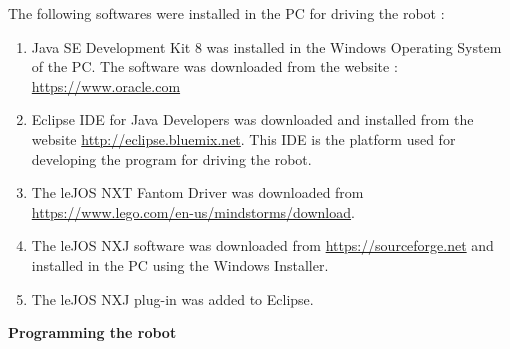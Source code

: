 \documentclass[10pt,a4paper]{article}
\begin{document}
		The following softwares were installed in the PC for driving the robot :
			\vspace{0.3cm}
			\begin{enumerate}
				
				\item
				Java SE Development Kit 8 was installed in the Windows Operating System of the PC. The software was downloaded from the website :\\ \href{https://www.oracle.com/technetwork/java/javase/downloads/jdk8-downloads-2133151.html}{https://www.oracle.com}
				\vspace{0.2cm}
				
				\item
				Eclipse IDE for Java Developers was downloaded and installed from the website 
				\href{http://eclipse.bluemix.net/packages/neon/?JAVA-WIN32}{http://eclipse.bluemix.net}. This IDE is the platform used for developing the program for driving the robot.
				\vspace{0.2cm}
				
				\item
				The leJOS NXT Fantom Driver was downloaded from  \href{https://www.lego.com/en-us/mindstorms/downloads}{https://www.lego.com/en-us/mindstorms/download}. 
				\vspace{0.2cm}
				
				\item
				The leJOS NXJ software was downloaded from \href{https://sourceforge.net/projects/nxt.lejos.p/files/}{https://sourceforge.net} and installed in the PC using the Windows Installer.
				\vspace{0.2cm}
				
				\item
				The leJOS NXJ plug-in was added to Eclipse.
				\vspace{0.5cm}
								
			\end{enumerate}
			\vspace{0.3cm}
			\textbf{Programming the robot}
	
\end{document}

